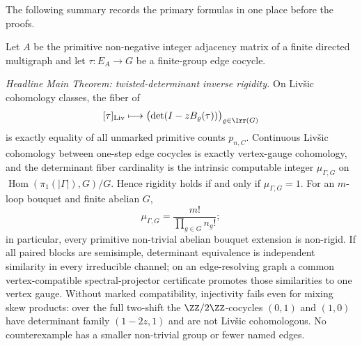 The following summary records the primary formulas in one place before the
proofs.
\begin{theoremsummary}
  \summaryrefstep\label{stmt:main-theorem-spine}
  Let \(A\) be the primitive non-negative integer adjacency matrix of a finite
  directed multigraph and let \(\tau:E_A\to G\) be a finite-group edge cocycle.

  \emph{Headline Main Theorem: twisted-determinant inverse rigidity.}
  On Liv\v{s}ic cohomology classes, the fiber of
  \[
    [\tau]_{\mathrm{Liv}}\longmapsto
    \bigl(\det(I-zB_\varrho(\tau))\bigr)_{\varrho\in\Irr(G)}
  \]
  is exactly equality of all unmarked primitive counts \(p_{n,C}\).
  Continuous Liv\v{s}ic cohomology between one-step edge cocycles is exactly
  vertex-gauge cohomology, and the determinant fiber cardinality is the
  intrinsic computable integer \(\mu_{\Gamma,G}\) on
  \(\operatorname{Hom}(\pi_1(|\Gamma|),G)/G\).  Hence rigidity holds if and
  only if \(\mu_{\Gamma,G}=1\).  For an \(m\)-loop bouquet and finite abelian
  \(G\),
  \[
    \mu_{\Gamma,G}=\frac{m!}{\prod_{g\in G}n_g!};
  \]
  in particular, every primitive non-trivial abelian bouquet extension is
  non-rigid.  If all paired blocks are semisimple, determinant equivalence is
  independent similarity in every irreducible channel; on an edge-resolving
  graph a common vertex-compatible spectral-projector certificate promotes
  those similarities to one vertex gauge.  Without marked compatibility,
  injectivity fails even for mixing skew products: over the full two-shift the
  \(\ZZ/2\ZZ\)-cocycles \((0,1)\) and \((1,0)\) have determinant family
  \((1-2z,1)\) and are not Liv\v{s}ic cohomologous.  No counterexample has a
  smaller non-trivial group or fewer named edges.


\end{theoremsummary}
